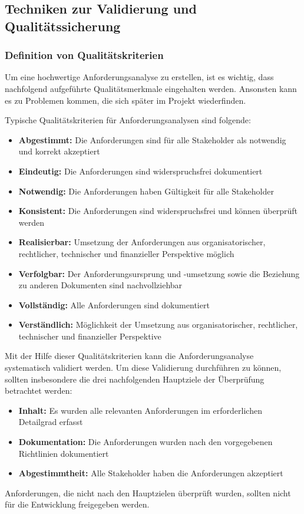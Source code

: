\subsection{Techniken zur Validierung und Qualitätssicherung}
\subsubsection{Definition von Qualitätskriterien}
Um eine hochwertige Anforderungsanalyse zu erstellen, ist es wichtig, dass nachfolgend aufgeführte Qualitätsmerkmale eingehalten werden.
Ansonsten kann es zu Problemen kommen, die sich später im Projekt wiederfinden.

Typische Qualitätskriterien für Anforderungsanalysen sind folgende:
\begin{itemize}
    \item \textbf{Abgestimmt:} Die Anforderungen sind für alle Stakeholder als notwendig und korrekt akzeptiert
    \item \textbf{Eindeutig:} Die Anforderungen sind widerspruchsfrei dokumentiert
    \item \textbf{Notwendig:} Die Anforderungen haben Gültigkeit für alle Stakeholder
    \item \textbf{Konsistent:} Die Anforderungen sind widerspruchsfrei und können überprüft werden
    \item \textbf{Realisierbar:} Umsetzung der Anforderungen aus organisatorischer, rechtlicher, technischer und finanzieller Perspektive möglich
    \item \textbf{Verfolgbar:} Der Anforderungsursprung und -umsetzung sowie die Beziehung zu anderen Dokumenten sind nachvollziehbar
    \item \textbf{Vollständig:} Alle Anforderungen sind dokumentiert
    \item \textbf{Verständlich:} Möglichkeit der Umsetzung aus organisatorischer, rechtlicher, technischer und finanzieller Perspektive
\end{itemize}\autocite[vgl.][Seite 44]{Maulhardt.b}

Mit der Hilfe dieser Qualitätskriterien kann die Anforderungsanalyse systematisch validiert werden.
Um diese Validierung durchführen zu können, sollten insbesondere die drei nachfolgenden Hauptziele der Überprüfung betrachtet werden:
\begin{itemize}
    \item \textbf{Inhalt:} Es wurden alle relevanten Anforderungen im erforderlichen Detailgrad erfasst
    \item \textbf{Dokumentation:} Die Anforderungen wurden nach den vorgegebenen Richtlinien dokumentiert
    \item \textbf{Abgestimmtheit:} Alle Stakeholder haben die Anforderungen akzeptiert
\end{itemize}
Anforderungen, die nicht nach den Hauptzielen überprüft wurden, sollten nicht für die Entwicklung freigegeben werden\autocite[vgl.][Seite 16ff]{Maulhardt.c}.

